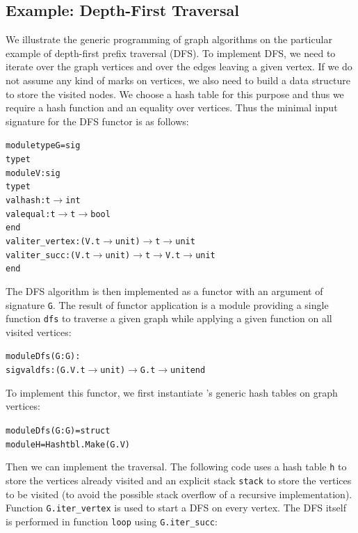 
\subsection{Example: Depth-First Traversal}
\label{XII:dfs}

We illustrate the generic programming of graph algorithms on the
particular example of depth-first prefix traversal (DFS).  To implement DFS,
we need to iterate over the graph vertices and over the edges leaving
a given vertex. If we do not assume any kind of marks on vertices, we
also need to build a data structure to store the visited nodes. 
We choose a hash table for this purpose and thus we require a hash
function and an equality over vertices.
Thus the minimal input signature for the DFS functor is as follows:
\begin{alltt}
module type G = sig
  type t
  module V : sig
    type t 
    val hash : t \ensuremath{\rightarrow} int 
    val equal : t \ensuremath{\rightarrow} t \ensuremath{\rightarrow} bool 
  end
  val iter_vertex : (V.t \ensuremath{\rightarrow} unit) \ensuremath{\rightarrow} t \ensuremath{\rightarrow} unit
  val iter_succ : (V.t \ensuremath{\rightarrow} unit) \ensuremath{\rightarrow} t \ensuremath{\rightarrow} V.t \ensuremath{\rightarrow} unit
end
\end{alltt}
The DFS algorithm is then implemented as a functor with an argument of
signature \texttt{G}. The result of functor application is a module
providing a single function \texttt{dfs} to traverse a given graph
while applying a given function on all visited vertices:
\begin{alltt}
module Dfs(G : G) : 
  sig val dfs : (G.V.t \ensuremath{\rightarrow} unit) \ensuremath{\rightarrow} G.t \ensuremath{\rightarrow} unit end
\end{alltt}
To implement this functor, we first instantiate \ocaml's generic hash
tables on graph vertices:
\begin{alltt}
module Dfs(G : G) = struct
  module H = Hashtbl.Make(G.V)
\end{alltt}
Then we can implement the traversal. The following code uses a hash
table \texttt{h} to store the vertices already visited and an explicit
stack \texttt{stack} to store the vertices to be visited (to avoid the
possible stack overflow of a recursive implementation). Function
\texttt{G.iter\_vertex} is used to start a DFS on every vertex. The
DFS itself is performed in function \texttt{loop} using \texttt{G.iter\_succ}:
